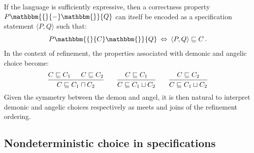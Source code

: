 \documentclass[11pt,oneside,draft]{book}
\theoremstyle{definition}
\newcommand{\htr}[3]{{ {#1} \mathbbm{\{} {#2} \mathbbm{\}} {#3} }}
\begin{document}
If the language is sufficiently expressive,
then a correctness property $\htr{P}{-}{Q}$
can itself be encoded \citep{specstm} as
a specification statement $\langle{}P,Q{}\rangle$
such that:
\[
    \htr{P}{C}{Q} \: \Leftrightarrow \:
    \langle{}P,Q{}\rangle \sqsubseteq C \,.
\]
In the context of refinement,
the properties associated with demonic and angelic choice
become:
\[
  \begin{prooftree}
    \hypo{C \sqsubseteq C_1}
    \hypo{C \sqsubseteq C_2}
    \infer2{C \sqsubseteq C_1 \sqcap C_2}
  \end{prooftree}
  \qquad
  \begin{prooftree}
    \hypo{C \sqsubseteq C_1}
    \infer1{C \sqsubseteq C_1 \sqcup C_2}
  \end{prooftree}
  \qquad
  \begin{prooftree}
    \hypo{C \sqsubseteq C_2}
    \infer1{C \sqsubseteq C_1 \sqcup C_2}
  \end{prooftree}
\]
Given the symmetry between the demon and angel,
it is then natural to interpret demonic and angelic choices
respectively as meets and joins
of the refinement ordering.

\subsection{Nondeterministic choice in specifications}
\end{document}

